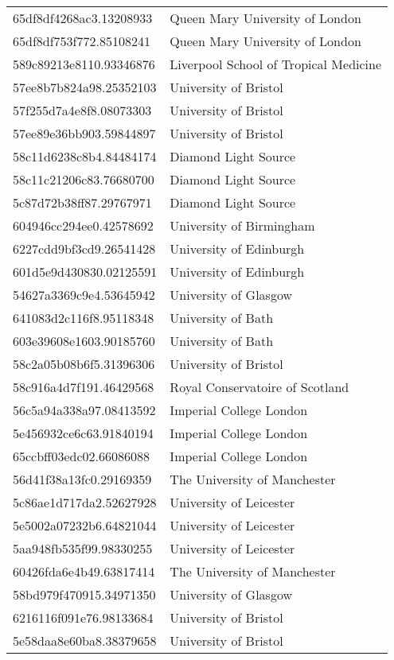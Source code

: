 \begin{tabular}{ll}
65df8df4268ac3.13208933 & Queen Mary University of London \\
65df8df753f772.85108241 & Queen Mary University of London \\
589c89213e8110.93346876 & Liverpool School of Tropical Medicine \\
57ee8b7b824a98.25352103 & University of Bristol \\
57f255d7a4e8f8.08073303 & University of Bristol \\
57ee89e36bb903.59844897 & University of Bristol \\
58c11d6238c8b4.84484174 & Diamond Light Source \\
58c11c21206c83.76680700 & Diamond Light Source \\
5c87d72b38ff87.29767971 & Diamond Light Source \\
604946cc294ee0.42578692 & University of Birmingham \\
6227cdd9bf3cd9.26541428 & University of Edinburgh \\
601d5e9d430830.02125591 & University of Edinburgh \\
54627a3369c9e4.53645942 & University of Glasgow \\
641083d2c116f8.95118348 & University of Bath \\
603e39608e1603.90185760 & University of Bath \\
58c2a05b08b6f5.31396306 & University of Bristol \\
58c916a4d7f191.46429568 & Royal Conservatoire of Scotland \\
56c5a94a338a97.08413592 & Imperial College London \\
5e456932ce6c63.91840194 & Imperial College London \\
65ccbff03edc02.66086088 & Imperial College London \\
56d41f38a13fc0.29169359 & The University of Manchester \\
5c86ae1d717da2.52627928 & University of Leicester \\
5e5002a07232b6.64821044 & University of Leicester \\
5aa948fb535f99.98330255 & University of Leicester \\
60426fda6e4b49.63817414 & The University of Manchester \\
58bd979f470915.34971350 & University of Glasgow \\
6216116f091e76.98133684 & University of Bristol \\
5e58daa8e60ba8.38379658 & University of Bristol \\

\end{tabular}
